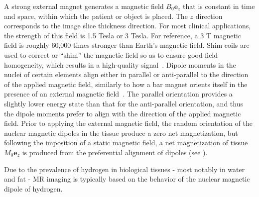 A strong external magnet generates a magnetic field $B_0\bm{e}_z$ that is constant in time and space, within which the patient or object is placed. The $z$ direction corresponds to the image slice thickness direction. For most clinical applications, the strength of this field is 1.5 Tesla or 3 Tesla. For reference, a 3 T magnetic field is roughly 60,000 times stronger than Earth's magnetic field. Shim coils are used to correct or ``shim'' the magnetic field so as to ensure good field homogeneity, which results in a high-quality signal~\cite{jacobs_2007}. Dipole moments in the nuclei of certain elements align either in parallel or anti-parallel to the direction of the applied magnetic field, similarly to how a bar magnet orients itself in the presence of an external magnetic field~\cite{hendrick_1994}. The parallel orientation provides a slightly lower energy state than that for the anti-parallel orientation, and thus the dipole moments prefer to align with the direction of the applied magnetic field. Prior to applying the external magnetic field, the random orientation of the nuclear magnetic dipoles in the tissue produce a zero net magnetization, but following the imposition of a static magnetic field, a net magnetization of tissue $M_0\bm{e}_z$ is produced from the preferential alignment of dipoles (see ).

Due to the prevalence of hydrogen in biological tissues - most notably in water and fat - MR imaging is typically based on the behavior of the nuclear magnetic dipole of hydrogen.

